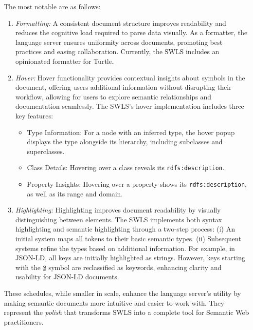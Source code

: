 The most notable are as follows:
\begin{enumerate}
  \item \textit{Formatting:}
    A consistent document structure improves readability and reduces the cognitive load required to parse data visually.
    As a formatter, the language server ensures uniformity across documents, promoting best practices and easing collaboration.
    Currently, the SWLS includes an opinionated formatter for Turtle.

  \item \textit{Hover:}
    Hover functionality provides contextual insights about symbols in the document, offering users additional information without disrupting their workflow,
    allowing for users to explore semantic relationships and documentation seamlessly.
    The SWLS’s hover implementation includes three key features:
    \begin{itemize}
      \item Type Information: For a node with an inferred type, the hover popup displays the type alongside its hierarchy, including subclasses and superclasses.
      \item Class Details: Hovering over a class reveals its \texttt{rdfs:description}.
      \item Property Insights: Hovering over a property shows its \texttt{rdfs:description}, as well as its range and domain.
    \end{itemize}

  \item \textit{Highlighting:}
    Highlighting improves document readability by visually distinguishing between elements.
    The SWLS implements both syntax highlighting and semantic highlighting through a two-step process:
        (i) An initial system maps all tokens to their basic semantic types.
        (ii) Subsequent systems refine the types based on additional information.
    For example, in JSON-LD, all keys are initially highlighted as strings.
    However, keys starting with the \texttt{@} symbol are reclassified as keywords, enhancing clarity and usability for JSON-LD documents.
\end{enumerate}

These schedules, while smaller in scale, enhance the language server’s utility by making semantic documents more intuitive and easier to work with.
They represent the \textit{polish} that transforms SWLS into a complete tool for Semantic Web practitioners.
